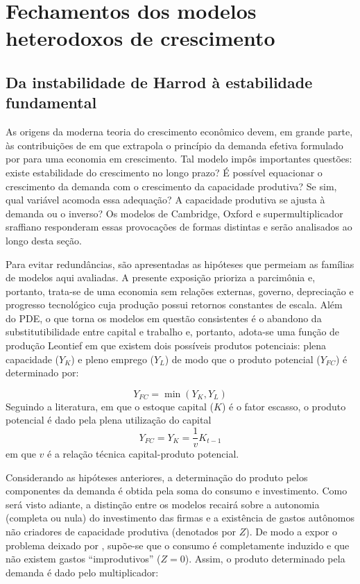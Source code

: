 \section{Fechamentos dos modelos heterodoxos de crescimento}
\subsection{Da instabilidade de Harrod à estabilidade fundamental}
\label{SecHarrod}

As origens da moderna teoria do crescimento econômico devem, em grande parte, às contribuições de \textcite{harrod_essay_1939} em que extrapola o princípio da demanda efetiva formulado por \textcite{keynes_general_1936} para uma economia em crescimento. Tal modelo impôs importantes questões: existe estabilidade do crescimento no longo pra\-zo? É possível equacionar o crescimento da demanda com o crescimento da capacidade produtiva? Se sim, qual variável acomoda essa adequação? A capacidade produtiva se ajusta à demanda ou o inverso? Os modelos de Cambridge, Oxford e supermultiplicador sraffiano responderam essas provocações de formas distintas e serão analisados ao longo desta seção.

Para evitar redundâncias, são apresentadas as hipóteses que permeiam as famílias de modelos aqui avaliadas. 
A presente exposição prioriza a parcimônia e, portanto, trata-se de uma economia sem relações externas, governo, depreciação e progresso tecnológico cuja produção possui retornos constantes de escala. Além do PDE, o que torna os modelos em questão consistentes é o abandono da substitutibilidade entre capital e trabalho e, portanto, adota-se uma função de produção Leontief em que existem dois possíveis produtos potenciais: plena capacidade ($Y_K$) e pleno emprego ($Y_L$) de modo que o produto potencial ($Y_{FC}$) é determinado por:

\begin{equation}
    Y_{FC} = \min (Y_K, Y_L)
\end{equation}
Seguindo a literatura, em que o estoque capital ($K$) é o fator escasso, o produto potencial é dado pela plena utilização do capital
\begin{equation}
\label{Oferta}
    Y_{FC} = Y_K = \frac{1}{v}K_{t-1}
\end{equation}
em que $v$ é a relação técnica capital-produto potencial. 


Considerando as hipóteses anteriores, a determinação do produto pelos componentes da demanda é obtida pela soma do consumo e investimento. Como será visto adiante, a distinção entre os modelos recairá sobre a autonomia (completa ou nula) do investimento das firmas e a existência de gastos autônomos não criadores de capacidade produtiva (denotados por $Z$). De modo a expor o problema deixado por \textcite{harrod_essay_1939}, supõe-se que o consumo é completamente induzido e que não existem gastos ``improdutivos'' ($Z=0$). Assim, o produto determinado pela demanda é dado pelo multiplicador:

